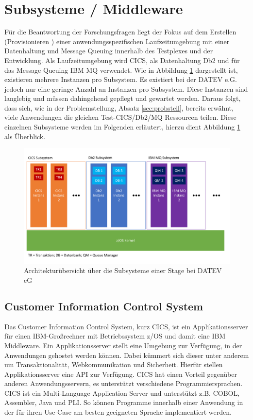 \section{Subsysteme / Middleware}
Für die Beantwortung der Forschungsfragen liegt der Fokus auf dem Erstellen (\glqq Provisionieren \grqq) einer anwendungsspezifischen Laufzeitumgebung mit einer Datenhaltung und Message Queuing innerhalb des Testplexes und der Entwicklung.
Als Laufzeitumgebung wird \glqq CICS\grqq, als Datenhaltung \glqq Db2\grqq{} und für das Message Queuing \glqq IBM MQ\grqq{} verwendet.
Wie in Abbildung \ref{fig:archüber} dargestellt ist, existieren mehrere Instanzen pro Subsystem.
Es existiert bei der DATEV e.G. jedoch nur eine geringe Anzahl an Instanzen pro Subsystem.
Diese Instanzen sind langlebig und müssen dahingehend gepflegt und gewartet werden.
Daraus folgt, dass sich, wie in der Problemstellung, Absatz \ref{sec:probstell}, bereits erwähnt, viele Anwendungen die gleichen Test-CICS/Db2/MQ Ressourcen teilen.
Diese einzelnen Subsysteme werden im Folgenden erläutert, hierzu dient Abbildung \ref{fig:archüber} als Überblick.

\begin{figure}[h!]
\centering
\includegraphics[width=\textwidth]{figures/architektur.pdf}
\caption{Architekturübersicht über die Subsysteme einer Stage bei DATEV eG}
\label{fig:archüber}
\end{figure}

\subsection{Customer Information Control System}\label{cics}
Das Customer Information Control System, kurz CICS, ist ein Applikationsserver für einen IBM-Großrechner mit Betriebssystem z/OS und damit eine IBM Middleware.
Ein Applikationsserver stellt eine Umgebung zur Verfügung, in der Anwendungen gehostet werden können.
Dabei kümmert sich dieser unter anderem um Transaktionalität, Webkommunikation und Sicherheit.
Hierfür stellen Applikationsserver eine API zur Verfügung.
CICS hat einen Vorteil gegenüber anderen Anwendungsservern, es unterstützt verschiedene Programmiersprachen.
CICS ist ein Multi-Language Application Server und unterstützt z.B. COBOL, Assembler, Java und PLI.
So können Programme innerhalb einer Anwendung in der für ihren Use-Case am besten geeigneten Sprache implementiert werden.
\cite{Rayns.2011}

